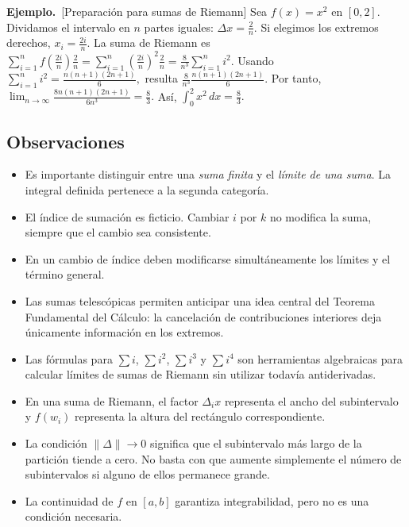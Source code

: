 \documentclass[12pt]{article}
\newenvironment{Ejem}
{\par\medskip\noindent\textbf{Ejemplo.}\ }
{\par\medskip}
\begin{document}
\begin{Ejem}[Preparación para sumas de Riemann]
Sea $f(x)=x^2$ en $[0,2]$. Dividamos el intervalo en $n$ partes iguales:
$
\Delta x=\frac{2}{n}.
$
Si elegimos los extremos derechos,
$
x_i=\frac{2i}{n}.
$
La suma de Riemann es
$
\sum_{i=1}^{n}
f\left(\frac{2i}{n}\right)\frac{2}{n}
=
\sum_{i=1}^{n}
\left(\frac{2i}{n}\right)^2\frac{2}{n}
=
\frac{8}{n^3}\sum_{i=1}^{n}i^2.
$
Usando
$
\sum_{i=1}^{n}i^2
=
\frac{n(n+1)(2n+1)}{6},
$
resulta
$
\frac{8}{n^3}
\frac{n(n+1)(2n+1)}{6}.
$
Por tanto,
$
\lim_{n\to\infty}
\frac{8n(n+1)(2n+1)}{6n^3}
=
\frac{8}{3}.
$
Así,
$
\int_0^2x^2\,dx=\frac83.
$
\end{Ejem}
\subsection*{Observaciones}
\begin{itemize}[leftmargin=1.5em]
    \item Es importante distinguir entre una \emph{suma finita} y el
    \emph{límite de una suma}. La integral definida pertenece a la segunda
    categoría.

    \item El índice de sumación es ficticio. Cambiar $i$ por $k$ no modifica la
    suma, siempre que el cambio sea consistente.

    \item En un cambio de índice deben modificarse simultáneamente los límites
    y el término general.

    \item Las sumas telescópicas permiten anticipar una idea central del
    Teorema Fundamental del Cálculo: la cancelación de contribuciones
    interiores deja únicamente información en los extremos.

    \item Las fórmulas para
    $\sum i$, $\sum i^2$, $\sum i^3$ y $\sum i^4$ son herramientas
    algebraicas para calcular límites de sumas de Riemann sin utilizar todavía
    antiderivadas.

    \item En una suma de Riemann, el factor $\Delta_i x$ representa el ancho
    del subintervalo y $f(w_i)$ representa la altura del rectángulo
    correspondiente.

    \item La condición $\|\Delta\|\to0$ significa que el subintervalo más largo
    de la partición tiende a cero. No basta con que aumente simplemente el
    número de subintervalos si alguno de ellos permanece grande.

    \item La continuidad de $f$ en $[a,b]$ garantiza integrabilidad, pero no es
    una condición necesaria.
\end{itemize}
\end{document}
